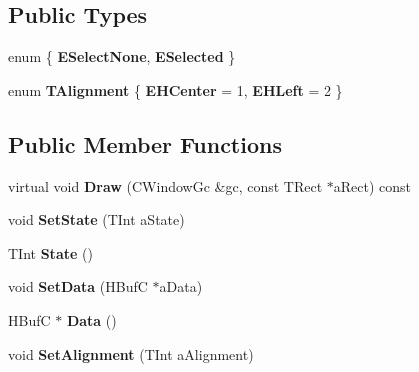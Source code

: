 \subsection*{Public Types}
\begin{DoxyCompactItemize}
\item 
\mbox{\label{classCHyperLinkText_acb95b4e70f69fb747810e9cd01be901f}} 
enum \{ {\bfseries E\+Select\+None}, 
{\bfseries E\+Selected}
 \}
\item 
\mbox{\label{classCHyperLinkText_a7bfc3eb05cd35e50d53dd8de137a9292}} 
enum {\bfseries T\+Alignment} \{ {\bfseries E\+H\+Center} = 1, 
{\bfseries E\+H\+Left} = 2
 \}
\end{DoxyCompactItemize}
\subsection*{Public Member Functions}
\begin{DoxyCompactItemize}
\item 
\mbox{\label{classCHyperLinkText_a3089595917ab676ed5de18d67b056f3a}} 
virtual void {\bfseries Draw} (C\+Window\+Gc \&gc, const T\+Rect $\ast$a\+Rect) const
\item 
\mbox{\label{classCHyperLinkText_accadc226d397931459d2319bc4f785a5}} 
void {\bfseries Set\+State} (T\+Int a\+State)
\item 
\mbox{\label{classCHyperLinkText_a7012fb7b98d5957b70579f0a52bed366}} 
T\+Int {\bfseries State} ()
\item 
\mbox{\label{classCHyperLinkText_a32e3137efd3ac6fbaea1485a6aa71368}} 
void {\bfseries Set\+Data} (H\+BufC $\ast$a\+Data)
\item 
\mbox{\label{classCHyperLinkText_a727abd845e0bd95b8cbcf60d1eecd401}} 
H\+BufC $\ast$ {\bfseries Data} ()
\item 
\mbox{\label{classCHyperLinkText_a8ba2a5d24895587c3b6f4009e3f9c8f2}} 
void {\bfseries Set\+Alignment} (T\+Int a\+Alignment)
\end{DoxyCompactItemize}
